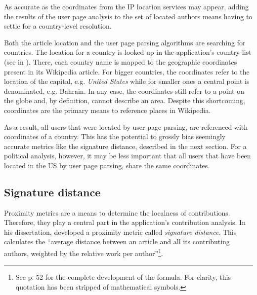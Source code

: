 As accurate as the coordinates from the \ac{IP} location services may appear, adding the results of the user page analysis to the set of located authors means having to settle for a country-level resolution.

Both the article location and the user page parsing algorithms are searching for countries.
The location for a country is looked up in the application's country list (see  in ).
There, each country name is mapped to the geographic coordinates present in its Wikipedia article.
For bigger countries, the coordinates refer to the location of the capital, e.g. \emph{United States} while for smaller ones a central point is denominated, e.g. Bahrain.
In any case, the coordinates still refer to a point on the globe and, by definition, cannot describe an area.
Despite this shortcoming, coordinates are the primary means to reference places in Wikipedia.

As a result, all users that were located by user page parsing, are referenced with coordinates of a country.
This has the potential to grossly bias seemingly accurate metrics like the signature distance, described in the next section.
For a political analysis, however, it may be less important that all users that have been located in the US by user page parsing, share the same coordinates.

\subsection{Signature distance}\label{sub:sigdist}

Proximity metrics are a means to determine the localness of contributions.
Therefore, they play a central part in the application's contribution analysis.
In his dissertation, \textcite{hardy2011volunteered} developed a proximity metric called \emph{signature distance}.
This calculates the ``average distance between an article and all its contributing authors, weighted by the relative work
per author''\footnote{See p. 52 for the complete development of the formula. For clarity, this quotation has been stripped of mathematical symbols.}.

